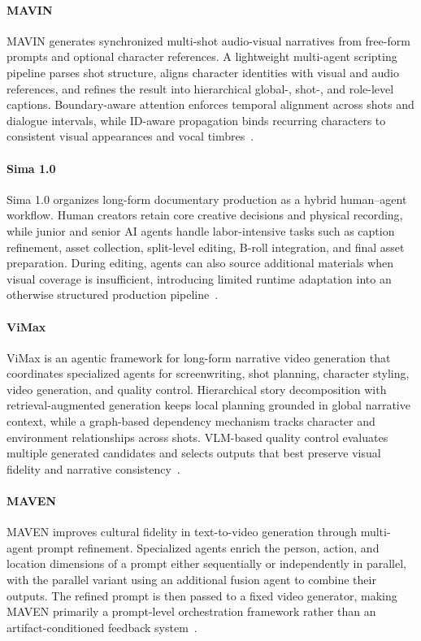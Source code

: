 \paragraph{MAVIN}
MAVIN generates synchronized multi-shot audio-visual narratives from free-form prompts and optional character references. A lightweight multi-agent scripting pipeline parses shot structure, aligns character identities with visual and audio references, and refines the result into hierarchical global-, shot-, and role-level captions. Boundary-aware attention enforces temporal alignment across shots and dialogue intervals, while ID-aware propagation binds recurring characters to consistent visual appearances and vocal timbres~\cite{avg260629473}.

\paragraph{Sima 1.0}
Sima 1.0 organizes long-form documentary production as a hybrid human--agent workflow. Human creators retain core creative decisions and physical recording, while junior and senior AI agents handle labor-intensive tasks such as caption refinement, asset collection, split-level editing, B-roll integration, and final asset preparation. During editing, agents can also source additional materials when visual coverage is insufficient, introducing limited runtime adaptation into an otherwise structured production pipeline~\cite{avg260407721}.

\paragraph{ViMax}
ViMax is an agentic framework for long-form narrative video generation that coordinates specialized agents for screenwriting, shot planning, character styling, video generation, and quality control. Hierarchical story decomposition with retrieval-augmented generation keeps local planning grounded in global narrative context, while a graph-based dependency mechanism tracks character and environment relationships across shots. VLM-based quality control evaluates multiple generated candidates and selects outputs that best preserve visual fidelity and narrative consistency~\cite{huang2026vimax}.

\paragraph{MAVEN}
MAVEN improves cultural fidelity in text-to-video generation through multi-agent prompt refinement. Specialized agents enrich the person, action, and location dimensions of a prompt either sequentially or independently in parallel, with the parallel variant using an additional fusion agent to combine their outputs. The refined prompt is then passed to a fixed video generator, making MAVEN primarily a prompt-level orchestration framework rather than an artifact-conditioned feedback system~\cite{avg260516716}.

